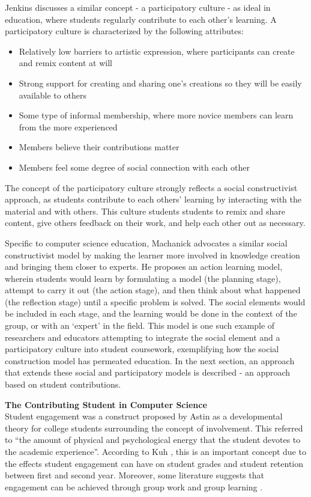 Jenkins \cite{jenkins2009confronting} discusses a similar concept - a participatory culture - as ideal in education, where students regularly contribute to each other's learning. A participatory culture is characterized by the following attributes:

\begin{itemize}
\item Relatively low barriers to artistic expression, where participants can create and remix content at will
\item Strong support for creating and sharing one’s creations so they will be easily available to others
\item Some type of informal membership, where more novice members can learn from the more experienced
\item Members believe their contributions matter
\item Members feel some degree of social connection with each other
\end{itemize}

The concept of the participatory culture strongly reflects a social constructivist approach, as students contribute to each others' learning by interacting with the material and with others. This culture students students to remix and share content, give others feedback on their work, and help each other out as necessary.

Specific to computer science education, Machanick \cite{machanick2007social} advocates a similar social constructivist model by making the learner more involved in knowledge creation and bringing them closer to experts. He proposes an action learning model, wherein students would learn by formulating a model (the planning stage), attempt to carry it out (the action stage), and then think about what happened (the reflection stage) until a specific problem is solved. The social elements would be included in each stage, and the learning would be done in the context of the group, or with an ‘expert’ in the field. This model is one such example of researchers and educators attempting to integrate the social element and a participatory culture into student coursework, exemplifying how the social construction model has permeated education. In the next section, an approach that extends these social and participatory models is described - an approach based on student contributions.

\textbf{The Contributing Student in Computer Science} \\
Student engagement was a construct proposed by Astin \cite{astin1984student} as a developmental theory for college students surrounding the concept of involvement. This referred to ``the amount of physical and psychological energy that the student devotes to the academic experience''. According to Kuh \cite{kuh2001assessing}, this is an important concept due to the effects student engagement can have on student grades and student retention between first and second year. Moreover, some literature suggests that engagement can be achieved through group work and group learning \cite{bower2007groupwork}.

